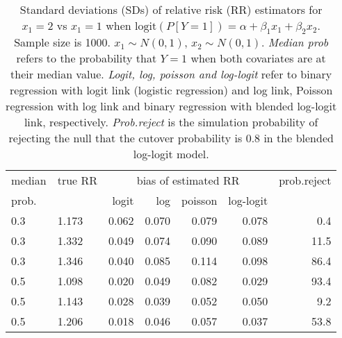 \documentclass[12pt,a4paper]{article}
\begin{document}
\begin{table}[H] 
\small\sf\centering 
\caption{Standard deviations (SDs) of relative risk (RR) estimators for $x_1=2$ vs $x_1=1$ when $\mbox{logit}(P[Y=1])=\alpha+\beta_1 x_1 + \beta_2 x_2$. Sample size is 1000. $x_1 \sim $$N(0,1)$, $x_2 \sim N(0,1)$. {\it Median prob} refers to the probability that $Y=1$ when both covariates are at their median value. {\it Logit, log, poisson and log-logit} refer to binary regression with logit link (logistic regression) and log link, Poisson regression with log link and binary regression with blended log-logit link, respectively. {\it Prob.reject} is the simulation probability of rejecting the null that the cutover probability is $0.8$ in the blended log-logit model.} 
\begin{tabular}{llrrrrr} 
\toprule 
median & true RR & \multicolumn{4}{c}{bias of estimated RR} & prob.reject \\ 
prob. & & logit & log & poisson & log-logit  & \\ \midrule 
0.3 & 1.173 & 0.062 & 0.070 & 0.079 & 0.078 &  0.4 \\  
0.3 & 1.332 & 0.049 & 0.074 & 0.090 & 0.089 & 11.5 \\  
0.3 & 1.346 & 0.040 & 0.085 & 0.114 & 0.098 & 86.4 \\  
0.5 & 1.098 & 0.020 & 0.049 & 0.082 & 0.029 & 93.4 \\  
0.5 & 1.143 & 0.028 & 0.039 & 0.052 & 0.050 &  9.2 \\  
0.5 & 1.206 & 0.018 & 0.046 & 0.057 & 0.037 & 53.8 \\  
\bottomrule 
\end{tabular} 
\end{table} 
\end{document}
